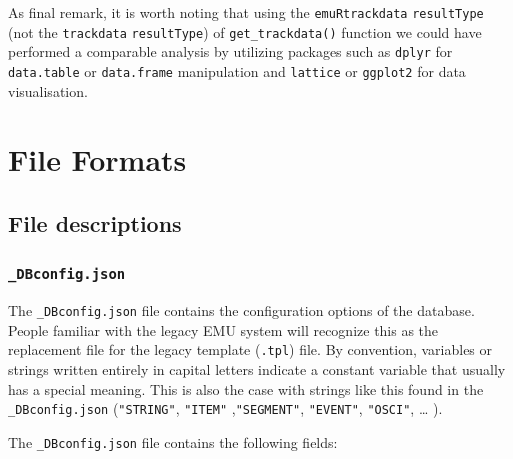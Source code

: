 \documentclass[]{book}
\theoremstyle{definition}
\theoremstyle{definition}
\theoremstyle{definition}
\theoremstyle{remark}
\begin{document}
As final remark, it is worth noting that using the
\texttt{emuRtrackdata} \texttt{resultType} (not the \texttt{trackdata}
\texttt{resultType}) of \texttt{get\_trackdata()} function we could have
performed a comparable analysis by utilizing packages such as
\texttt{dplyr} for \texttt{data.table} or \texttt{data.frame}
manipulation and \texttt{lattice} or \texttt{ggplot2} for data
visualisation.

\hypertarget{app_chap:fileFormats}{%
\chapter{File Formats}\label{app_chap:fileFormats}}

\hypertarget{file-descriptions}{%
\section{File descriptions}\label{file-descriptions}}

\hypertarget{subsec:app-chapFileFormatsDBconfig}{%
\subsection{\texorpdfstring{\texttt{\_DBconfig.json}}{\_DBconfig.json}}\label{subsec:app-chapFileFormatsDBconfig}}

The \texttt{\_DBconfig.json} file contains the configuration options of
the database. People familiar with the legacy EMU system will recognize
this as the replacement file for the legacy template (\texttt{.tpl})
file. By convention, variables or strings written entirely in capital
letters indicate a constant variable that usually has a special meaning.
This is also the case with strings like this found in the
\texttt{\_DBconfig.json} (\texttt{"STRING"}, \texttt{"ITEM"}
,\texttt{"SEGMENT"}, \texttt{"EVENT"}, \texttt{"OSCI"}, \ldots{} ).

The \texttt{\_DBconfig.json} file contains the following fields:
\end{document}
